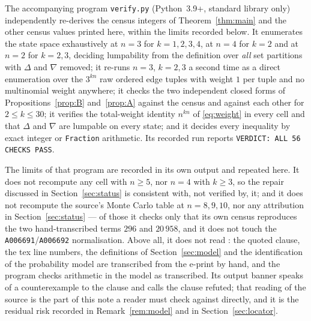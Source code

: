 \documentclass[11pt]{amsart}
\theoremstyle{remark}
\begin{document}
The accompanying program \texttt{verify.py} (Python~3.9+, standard library only)
independently re-derives the census integers of Theorem~\ref{thm:main} and the other
census values printed here, within the limits recorded below.  It enumerates the state space
exhaustively at $n=3$ for $k=1,2,3,4$, at $n=4$ for $k=2$ and at $n=2$ for $k=2,3$,
deciding lumpability from the definition over \emph{all} set partitions with $\Delta$ and
$\nabla$ removed; it re-runs $n=3$, $k=2,3$ a second time as a direct enumeration over the
$3^{kn}$ raw ordered edge tuples with weight $1$ per tuple and no multinomial weight
anywhere; it checks the two independent closed forms of Propositions~\ref{prop:B}
and~\ref{prop:A} against the census and against each other for $2\le k\le30$; it verifies
the total-weight identity $n^{kn}$ of \eqref{eq:weight} in every cell and that $\Delta$ and
$\nabla$ are lumpable on every state; and it decides every inequality by
exact integer or \texttt{Fraction} arithmetic.  Its recorded run reports
\texttt{VERDICT: ALL 56 CHECKS PASS}.

The limits of that program are recorded in its own output and repeated here.  It does not
recompute any cell with $n\ge5$, nor $n=4$ with $k\ge3$, so the repair discussed in
Section~\ref{sec:status} is consistent with, not verified by, it; and it does not recompute
the source's Monte Carlo table at $n=8,9,10$, nor any attribution in
Section~\ref{sec:status} --- of those it checks only that its own census reproduces the two
hand-transcribed terms $296$ and $20\,958$, and it does not touch the
\texttt{A006691}/\texttt{A006692} normalisation.  Above all, it does not read \cite{DR}: the
quoted clause, the tex line numbers, the definitions of Section~\ref{sec:model} and the
identification of the probability model are transcribed from the e-print by hand, and the
program checks arithmetic in the model as transcribed.  Its output banner speaks of a
counterexample to the clause and calls the clause refuted; that reading of the source is the
part of this note a reader must check against \cite{DR} directly, and it is the residual
risk recorded in Remark~\ref{rem:model} and in Section~\ref{sec:locator}.
\end{document}
